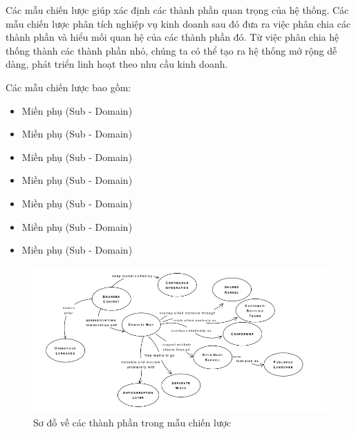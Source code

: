 Các mẫu chiến lược giúp xác định các thành phần quan trọng của hệ thống. Các mẫu chiến lược phân tích nghiệp vụ kinh doanh sau đó đưa ra việc phân chia các thành phần và hiểu mối quan hệ của các thành phần đó. Từ việc phân chia hệ thống thành các thành phần nhỏ, chúng ta có thể tạo ra hệ thống mở rộng dễ dàng, phát triển linh hoạt theo nhu cầu kinh doanh.

Các mẫu chiến lược bao gồm:

\begin{itemize}

\item Miền phụ (Sub - Domain)













\item Miền phụ (Sub - Domain)

\item Miền phụ (Sub - Domain)

\item Miền phụ (Sub - Domain)

\item Miền phụ (Sub - Domain)

\item Miền phụ (Sub - Domain)

\item Miền phụ (Sub - Domain)

\end{itemize}

\begin{figure}[H]

\centering

\includegraphics[scale = 0.9]{pictures/cac_mau_chien_luoc/temp.png}

\caption{Sơ đồ về các thành phần trong mẫu chiến lược}

\end{figure}

